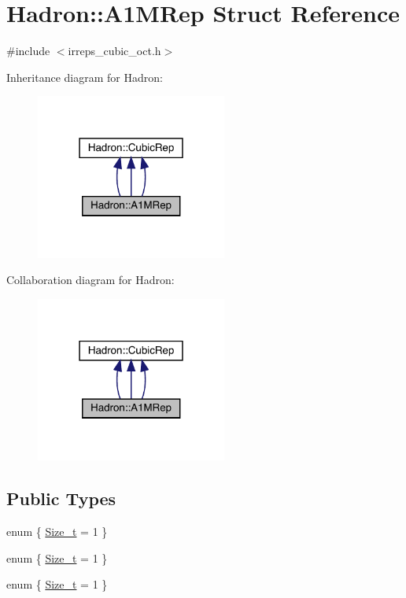 \hypertarget{structHadron_1_1A1MRep}{}\section{Hadron\+:\+:A1\+M\+Rep Struct Reference}
\label{structHadron_1_1A1MRep}


{\ttfamily \#include $<$irreps\+\_\+cubic\+\_\+oct.\+h$>$}



Inheritance diagram for Hadron\+:
\nopagebreak
\begin{figure}[H]
\begin{center}
\leavevmode
\includegraphics[width=178pt]{db/d3e/structHadron_1_1A1MRep__inherit__graph}
\end{center}
\end{figure}


Collaboration diagram for Hadron\+:
\nopagebreak
\begin{figure}[H]
\begin{center}
\leavevmode
\includegraphics[width=178pt]{da/d56/structHadron_1_1A1MRep__coll__graph}
\end{center}
\end{figure}
\subsection*{Public Types}
\begin{DoxyCompactItemize}
\item 
enum \{ \mbox{\hyperlink{structHadron_1_1A1MRep_ab9efd7188ac110478add16fadff0ad6aa8c0218fbd5c7fb561bbb665bfffbd142}{Size\+\_\+t}} = 1
 \}
\item 
enum \{ \mbox{\hyperlink{structHadron_1_1A1MRep_ab9efd7188ac110478add16fadff0ad6aa8c0218fbd5c7fb561bbb665bfffbd142}{Size\+\_\+t}} = 1
 \}
\item 
enum \{ \mbox{\hyperlink{structHadron_1_1A1MRep_ab9efd7188ac110478add16fadff0ad6aa8c0218fbd5c7fb561bbb665bfffbd142}{Size\+\_\+t}} = 1
 \}
\end{DoxyCompactItemize}
